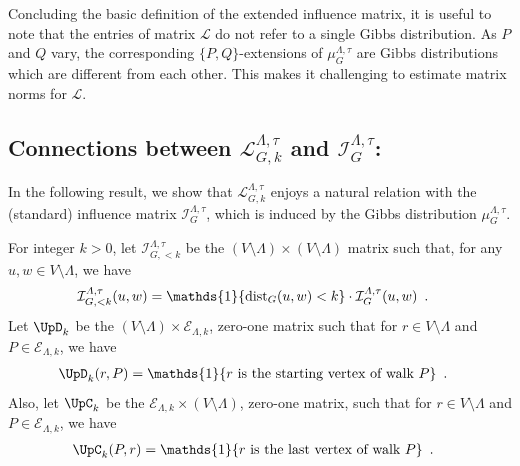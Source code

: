 \documentclass[11pt,reqno]{amsart}
\numberwithin{equation}{section}
\newcommand{\cE}{{\mathcal{E}}}
\newcommand{\cI}{{\mathcal{I}}}
\newcommand{\cL}{{\mathcal{L}}}
\newcommand{\applegreen}[1]{ {\color{applegreen}#1}}
\newcommand{\amethyst}[1]{{\color{amethyst}#1} }
\newcommand{\blue}[1]{{\color{blue}#1}}
\newcommand{\bluepigment}[1]{{\color{blue(pigment)}#1}}
\newcommand{\bostonuniversityred}[1]{{\color{bostonuniversityred}#1}}
\newcommand{\goldenbrown}[1]{{\color{goldenbrown}#1}}
\newcommand{\iris}[1]{{\color{iris}#1}}
\newcommand{\red}[1]{{\color{red}#1}}
\newcommand{\rosegold}[1]{{\color{rosegold}#1}}
\newcommand{\Ind}{\mathds{1}}
\newcommand{\dist}{{\rm dist}}
\newcommand{\ExtV}{\iris{\cE}}
\newcommand{\infmatrix}{\cI}
\newcommand{\VToEdge}{\UpD}
\newcommand{\EdgeToV}{\UpC}
\renewcommand{\applegreen}[1]{#1}
\renewcommand{\amethyst}[1]{#1}
\renewcommand{\blue}[1]{#1}
\renewcommand{\bluepigment}[1]{#1}
\renewcommand{\bostonuniversityred}[1]{#1}
\renewcommand{\goldenbrown}[1]{#1}
\renewcommand{\iris}[1]{#1}
\renewcommand{\red}[1]{#1}
\renewcommand{\rosegold}[1]{#1}
\newcommand{\kk}{\bluepigment{k}}
\newcommand{\kP}{\goldenbrown{P}}
\newcommand{\kQ}{\amethyst{Q}}
\newcommand{\kr}{\bostonuniversityred{r}}%
\newcommand{\ku}{\red{u}}
\newcommand{\kw}{\blue{w}}
\renewcommand{\kk}{k}
\renewcommand{\kP}{P}
\renewcommand{\kQ}{Q}
\renewcommand{\kr}{r}
\renewcommand{\ku}{u}
\renewcommand{\kw}{w}
\newcommand{\ExtdInfMatrix}{\rosegold{\cL}}
\newcommand{\ExtdInfMatrixF}{\applegreen{\cL}^{\Lambda,\tau}_{G,\kk}}
\newcommand{\spset}{\ExtV}
\begin{document}
Concluding the basic definition of the extended influence matrix, it is useful to note that the entries of matrix 
$\ExtdInfMatrix$ do not refer to a single Gibbs distribution.  As $\kP$ and $\kQ$ vary, the corresponding 
$\{\kP,\kQ\}$-extensions of $\mu^{\Lambda,\tau}_G$ are  Gibbs distributions which are different from each 
other. This makes it  challenging to estimate matrix norms for $\ExtdInfMatrix$.

 



\subsection*{Connections between $\ExtdInfMatrixF$ and $\infmatrix^{\Lambda,\tau}_G$:}
%
In the following result, we show that
$\ExtdInfMatrixF$ enjoys a natural relation with the (standard) influence matrix $ \infmatrix^{\Lambda,\tau}_G$,
which is induced by the Gibbs distribution $\mu^{\Lambda,\tau}_G$.

For integer $\kk>0$,  let $\infmatrix^{\Lambda,\tau}_{G, <\kk}$ be the $(V\setminus \Lambda)\times (V\setminus \Lambda)$ matrix 
such that, for any $\ku,\kw\in V\setminus \Lambda$, we have
\begin{align}\label{eq:DefOfCISmallerK}
 \infmatrix^{\Lambda,\tau}_{G,<\kk}(\ku,\kw) &= \Ind\{\dist_{G}(\ku,\kw)< \kk\} \cdot \infmatrix^{\Lambda,\tau}_{G}(\ku,\kw) \enspace. 
\end{align}
Let $\VToEdge_{\kk}$ be the $(V\setminus \Lambda)\times \spset_{\Lambda,\kk}$, zero-one matrix such that for 
$\kr \in V\setminus \Lambda$ and $\kP \in \spset_{\Lambda,\kk}$, we have 
\begin{align} \label{def:Vertex2EdgeMatrixEntryBB}
\VToEdge_{\kk}(\kr, \kP) &= \Ind\{ \textrm{$\kr$ is the starting vertex of walk $\kP$} \} \enspace.
\end{align}
Also, let $\EdgeToV_{\kk}$ be the $\ExtV_{\Lambda, \kk}\times (V\setminus \Lambda)$, zero-one matrix, such that for 
 $\kr \in V\setminus \Lambda$ and $\kP \in \spset_{\Lambda,\kk}$, we have
\begin{align} \label{def:Edge2VertexMatrixEntryBB}
\EdgeToV_{\kk} (\kP, \kr) &= \Ind\{ \textrm{$\kr$ is the last vertex of walk $\kP$}\} \enspace.
\end{align}
\end{document}
